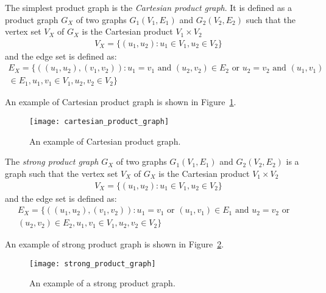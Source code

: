 \begin{definition}
The simplest product graph is the \emph{Cartesian product graph}. It is defined as a product graph $G_X$ of two graphs $G_1(V_1,E_1)$ and $G_2(V_2,E_2)$ such that the vertex set $V_X$ of $G_X$ is the Cartesian product $V_1\times V_2$ \ie
\begin{align*}
V_X =\lbrace (u_1,u_2):u_1\in V_1, u_2\in V_2\rbrace
\end{align*}
and the edge set is defined as:
\begin{align*}
E_X =\lbrace ((u_1,u_2),(v_1,v_2)):u_1=v_1\text{ and }(u_2,v_2)\in E_2\text{ or }u_2=v_2\text{ and }(u_1,v_1)&\\ \in E_1,
u_1,v_1\in V_1, u_2,v_2\in V_2\rbrace&
\end{align*}
\end{definition}
An example of Cartesian product graph is shown in Figure~\ref{fig:gm:cartesian_product_graph}.

\begin{figure}[h!]
\begin{center}
\texttt{[image: cartesian\_product\_graph]}
\caption{An example of Cartesian product graph.}
\label{fig:gm:cartesian_product_graph}
\end{center}
\end{figure}

\begin{definition}
The \emph{strong product graph} $G_X$ of two graphs $G_1(V_1,E_1)$ and $G_2(V_2,E_2)$ is a graph such that the vertex set $V_X$ of $G_X$ is the Cartesian product $V_1\times V_2$ \ie
\begin{align*}
V_X =\lbrace (u_1,u_2):u_1\in V_1, u_2\in V_2\rbrace
\end{align*}
and the edge set is defined as:
\begin{align*}
E_X =\lbrace ((u_1,u_2),(v_1,v_2)):u_1=v_1\text{ or }(u_1,v_1)\in E_1\text{ and }u_2=v_2\text{ or }&\\(u_2,v_2)\in E_2,
u_1,v_1\in V_1, u_2,v_2\in V_2\rbrace&
\end{align*}
\end{definition}
An example of strong product graph is shown in Figure~\ref{fig:gm:strong_product_graph}.

\begin{figure}
\begin{center}
\texttt{[image: strong\_product\_graph]}
\caption{An example of a strong product graph.}
\label{fig:gm:strong_product_graph}
\end{center}
\end{figure}

